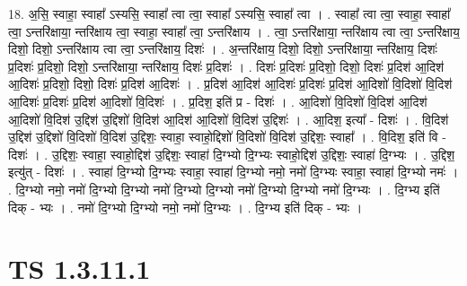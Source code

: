 \documentclass[17pt]{extarticle}
\begin{document}
18. अ॒सि॒ स्वाहा॒ स्वाहा᳚ ऽस्यसि॒ स्वाहा᳚ त्वा त्वा॒ स्वाहा᳚ ऽस्यसि॒ स्वाहा᳚ त्वा । . स्वाहा᳚ त्वा त्वा॒ स्वाहा॒ स्वाहा᳚ त्वा॒ ऽन्तरि॑क्षाया॒ न्तरि॑क्षाय त्वा॒ स्वाहा॒ स्वाहा᳚ त्वा॒ ऽन्तरि॑क्षाय । . त्वा॒ ऽन्तरि॑क्षाया॒ न्तरि॑क्षाय त्वा त्वा॒ ऽन्तरि॑क्षाय॒ दिशो॒ दिशो॒ ऽन्तरि॑क्षाय त्वा त्वा॒ ऽन्तरि॑क्षाय॒ दिशः॑ । . अ॒न्तरि॑क्षाय॒ दिशो॒ दिशो॒ ऽन्तरि॑क्षाया॒ न्तरि॑क्षाय॒ दिशः॑ प्र॒दिशः॑ प्र॒दिशो॒ दिशो॒ ऽन्तरि॑क्षाया॒ न्तरि॑क्षाय॒ दिशः॑ प्र॒दिशः॑ । . दिशः॑ प्र॒दिशः॑ प्र॒दिशो॒ दिशो॒ दिशः॑ प्र॒दिश॑ आ॒दिश॑ आ॒दिशः॑ प्र॒दिशो॒ दिशो॒ दिशः॑ प्र॒दिश॑ आ॒दिशः॑ । . प्र॒दिश॑ आ॒दिश॑ आ॒दिशः॑ प्र॒दिशः॑ प्र॒दिश॑ आ॒दिशो॑ वि॒दिशो॑ वि॒दिश॑ आ॒दिशः॑ प्र॒दिशः॑ प्र॒दिश॑ आ॒दिशो॑ वि॒दिशः॑ । . प्र॒दिश॒ इति॑ प्र - दिशः॑ । . आ॒दिशो॑ वि॒दिशो॑ वि॒दिश॑ आ॒दिश॑ आ॒दिशो॑ वि॒दिश॑ उ॒द्दिश॑ उ॒द्दिशो॑ वि॒दिश॑ आ॒दिश॑ आ॒दिशो॑ वि॒दिश॑ उ॒द्दिशः॑ । . आ॒दिश॒ इत्या᳚ - दिशः॑ । . वि॒दिश॑ उ॒द्दिश॑ उ॒द्दिशो॑ वि॒दिशो॑ वि॒दिश॑ उ॒द्दिशः॒ स्वाहा॒ स्वाहो॒द्दिशो॑ वि॒दिशो॑ वि॒दिश॑ उ॒द्दिशः॒ स्वाहा᳚ । . वि॒दिश॒ इति॑ वि - दिशः॑ । . उ॒द्दिशः॒ स्वाहा॒ स्वाहो॒द्दिश॑ उ॒द्दिशः॒ स्वाहा॑ दि॒ग्भ्यो दि॒ग्भ्यः स्वाहो॒द्दिश॑ उ॒द्दिशः॒ स्वाहा॑ दि॒ग्भ्यः । . उ॒द्दिश॒ इत्यु॑त् - दिशः॑ । . स्वाहा॑ दि॒ग्भ्यो दि॒ग्भ्यः स्वाहा॒ स्वाहा॑ दि॒ग्भ्यो नमो॒ नमो॑ दि॒ग्भ्यः स्वाहा॒ स्वाहा॑ दि॒ग्भ्यो नमः॑ । . दि॒ग्भ्यो नमो॒ नमो॑ दि॒ग्भ्यो दि॒ग्भ्यो नमो॑ दि॒ग्भ्यो दि॒ग्भ्यो नमो॑ दि॒ग्भ्यो दि॒ग्भ्यो नमो॑ दि॒ग्भ्यः । . दि॒ग्भ्य इति॑ दिक् - भ्यः । . नमो॑ दि॒ग्भ्यो दि॒ग्भ्यो नमो॒ नमो॑ दि॒ग्भ्यः । . दि॒ग्भ्य इति॑ दिक् - भ्यः । \newline
\pagebreak
{}
\section*{ TS 1.3.11.1 }
\end{document}
